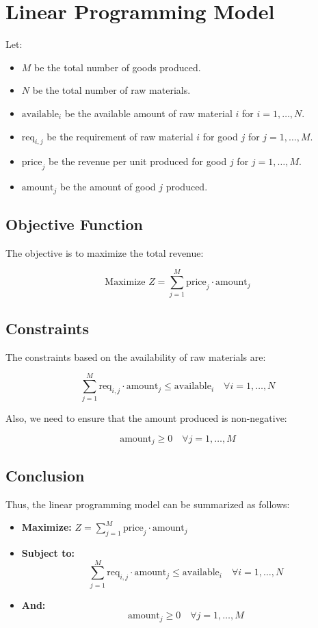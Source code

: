 \documentclass{article}
\begin{document}
\section*{Linear Programming Model}

Let:
\begin{itemize}
    \item \( M \) be the total number of goods produced.
    \item \( N \) be the total number of raw materials.
    \item \( \text{available}_i \) be the available amount of raw material \( i \) for \( i = 1, \ldots, N \).
    \item \( \text{req}_{i,j} \) be the requirement of raw material \( i \) for good \( j \) for \( j = 1, \ldots, M \).
    \item \( \text{price}_j \) be the revenue per unit produced for good \( j \) for \( j = 1, \ldots, M \).
    \item \( \text{amount}_j \) be the amount of good \( j \) produced.
\end{itemize}

\subsection*{Objective Function}

The objective is to maximize the total revenue:

\[
\text{Maximize } Z = \sum_{j=1}^{M} \text{price}_j \cdot \text{amount}_j
\]

\subsection*{Constraints}

The constraints based on the availability of raw materials are:

\[
\sum_{j=1}^{M} \text{req}_{i,j} \cdot \text{amount}_j \leq \text{available}_i \quad \forall i = 1, \ldots, N
\]

Also, we need to ensure that the amount produced is non-negative:

\[
\text{amount}_j \geq 0 \quad \forall j = 1, \ldots, M
\]

\subsection*{Conclusion}

Thus, the linear programming model can be summarized as follows:

\begin{itemize}
    \item \textbf{Maximize:} \( Z = \sum_{j=1}^{M} \text{price}_j \cdot \text{amount}_j \)
    \item \textbf{Subject to:} 
    \[
    \sum_{j=1}^{M} \text{req}_{i,j} \cdot \text{amount}_j \leq \text{available}_i \quad \forall i = 1, \ldots, N
    \]
    \item \textbf{And:} 
    \[
    \text{amount}_j \geq 0 \quad \forall j = 1, \ldots, M
    \]
\end{itemize}
\end{document}
